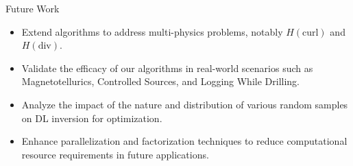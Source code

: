\begin{frame}{Future Work}

\begin{itemize}
  \item Extend algorithms to address multi-physics problems, notably \( H(\text{curl}) \) and \( H(\text{div}) \).
  \vspace{0.2cm}
  \item Validate the efficacy of our algorithms in real-world scenarios such as Magnetotellurics, Controlled Sources, and Logging While Drilling.
  \vspace{0.3cm}
  \item Analyze the impact of the nature and distribution of various random samples on DL inversion for optimization.
  \vspace{0.3cm}
  \item Enhance parallelization and factorization techniques to reduce computational resource requirements in future applications.
  \vspace{0.3cm}
\end{itemize}

\end{frame}
